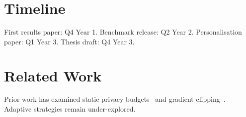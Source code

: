 \documentclass[11pt]{article}
\begin{document}
\section{Timeline}
First results paper: Q4 Year 1. Benchmark release: Q2 Year 2. Personalisation paper: Q1 Year 3. Thesis draft: Q4 Year 3.

\section{Related Work}
Prior work has examined static privacy budgets~\cite{dp-fl-2020} and gradient clipping~\cite{clipping-2021}. Adaptive strategies remain under-explored.
\end{document}
